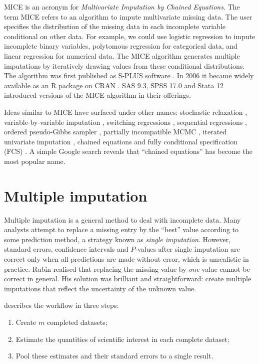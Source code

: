 \documentclass[
]{book}
\providecommand{\tightlist}{%
  \setlength{\itemsep}{0pt}\setlength{\parskip}{0pt}}
\begin{document}
MICE is an acronym for \emph{Multivariate Imputation by Chained Equations}. The term MICE refers to an algorithm to impute multivariate missing data. The user specifies the distribution of the missing data in each incomplete variable conditional on other data. For example, we could use logistic regression to impute incomplete binary variables, polytomous regression for categorical data, and linear regression for numerical data. The MICE algorithm generates multiple imputations by iteratively drawing values from these conditional distributions. The algorithm was first published as S-PLUS software \citep{VANBUUREN1999B}. In 2006 it became widely available as an R package on CRAN \citep{VANBUUREN2011}. SAS 9.3, SPSS 17.0 and Stata 12 introduced versions of the MICE algorithm in their offerings.

Ideas similar to MICE have surfaced under other names: stochastic relaxation \citep{KENNICKELL1991}, variable-by-variable imputation \citep{BRAND1999}, switching regressions \citep{VANBUUREN1999}, sequential regressions \citep{RAGHUNATHAN2001}, ordered pseudo-Gibbs sampler \citep{HECKERMAN2001}, partially incompatible MCMC \citep{RUBIN2003}, iterated univariate imputation \citep{GELMAN2004}, chained equations \citep{VANBUUREN1999B} and fully conditional specification (FCS) \citep{VANBUUREN2006}. A simple Google search reveals that ``chained equations'' has become the most popular name.

\section{Multiple imputation}\label{multiple-imputation}

Multiple imputation \citep{RUBIN1987} is a general method to deal with incomplete data. Many analysts attempt to replace a missing entry by the ``best'' value according to some prediction method, a strategy known as \emph{single imputation}. However, standard errors, confidence intervals and \(P\)-values after single imputation are correct only when all predictions are made without error, which is unrealistic in practice. Rubin realised that replacing the missing value by \emph{one} value cannot be correct in general. His solution was brilliant and straightforward: create multiple imputations that reflect the uncertainty of the unknown value.

\citet{RUBIN1987} describes the workflow in three steps:

\begin{enumerate}
\def\labelenumi{\arabic{enumi}.}
\tightlist
\item
  Create \(m\) completed datasets;
\item
  Estimate the quantities of scientific interest in each complete dataset;
\item
  Pool these estimates and their standard errors to a single result.
\end{enumerate}
\end{document}
